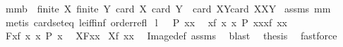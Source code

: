 \begin{isabellebody}
\isanewline
\isanewline
{}\isamarkupfalse%
\ mm{}{}b{\isacharcolon}\ \ {\isachardoublequoteopen}finite\ X{\isachardoublequoteclose}\ {\isachardoublequoteopen}finite\ Y{\isachardoublequoteclose}\ {\isachardoublequoteopen}card\ X\ {\isacharequal}card\ Y{\isachardoublequoteclose}\ \ {\isachardoublequoteopen}{\isacharparenleft}card\ {\isacharparenleft}X{\isasyminter}Y{\isacharparenright}{\isacharequal}card\ X{\isacharparenright}{\isacharequal}{\isacharparenleft}X{\isacharequal}Y{\isacharparenright}{\isachardoublequoteclose}\isanewline
%
\isadelimproof
%
\endisadelimproof
%
\isatagproof
{}\isamarkupfalse%
\ assms\ mm{}{}\ \isamarkupfalse%
\ {\isacharparenleft}metis\ card{\isacharunderscore}seteq\ le{\isacharunderscore}iff{\isacharunderscore}inf\ order{\isacharunderscore}refl{\isacharparenright}%
\endisatagproof
{\isafoldproof}%
%
\isadelimproof
\isanewline
%
\endisadelimproof
\isanewline
{}\isamarkupfalse%
\ l{}{}{\isacharcolon}\ \ \ {\isachardoublequoteopen}P\ xx{\isachardoublequoteclose}\ \ \isanewline
{\isachardoublequoteopen}{\isacharbraceleft}{\isacharparenleft}x{\isacharcomma}f\ x{\isacharparenright}{\isacharbar}\ x{\isachardot}\ P\ x{\isacharbraceright}{\isacharcomma}{\isacharcomma}xx{\isacharequal}f\ xx{\isachardoublequoteclose}\ \isanewline
%
\isadelimproof
%
\endisadelimproof
%
\isatagproof
{}\isamarkupfalse%
\ {\isacharminus}\isanewline
{}\isamarkupfalse%
\ {\isacharquery}F{\isacharequal}{\isachardoublequoteopen}{\isacharbraceleft}{\isacharparenleft}x{\isacharcomma}f\ x{\isacharparenright}{\isacharbar}\ x{\isachardot}\ P\ x{\isacharbraceright}{\isachardoublequoteclose}\ \isamarkupfalse%
\ {\isacharquery}X{\isacharequal}{\isachardoublequoteopen}{\isacharquery}F{\isacharbackquote}{\isacharbackquote}{\isacharbraceleft}xx{\isacharbraceright}{\isachardoublequoteclose}\isanewline
{}\isamarkupfalse%
\ {\isachardoublequoteopen}{\isacharquery}X{\isacharequal}{\isacharbraceleft}f\ xx{\isacharbraceright}{\isachardoublequoteclose}\ \isamarkupfalse%
\ Image{\isacharunderscore}def\ assms\ \isamarkupfalse%
\ blast\ \isamarkupfalse%
\ {\isacharquery}thesis\ \isamarkupfalse%
\ fastforce\ \isanewline
{}\isamarkupfalse%
%
\endisatagproof
{\isafoldproof}%
%
\isadelimproof
%
\endisadelimproof
\isanewline
\isanewline
{}\isamarkupfalse%

\end{isabellebody}
